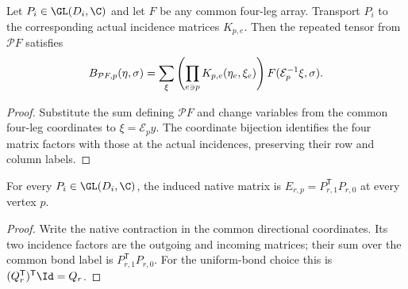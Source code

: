 \begin{lemma}%
    \label{thm:peps_four_leg_incident_expansion}
    \leanok
    Let $P_i\in\GL(D_i,\C)$ and let $F$ be any common four-leg array.
    Transport $P_i$ to the corresponding actual incidence matrices $K_{p,e}$.
    Then the repeated tensor from $\mathcal P F$ satisfies
    \begin{align}
        B_{\mathcal P F,p}(\eta,\sigma)
        =\sum_\xi\left(\prod_{e\ni p}K_{p,e}(\eta_e,\xi_e)\right)
        F(\mathcal E_p^{-1}\xi,\sigma).\notag
    \end{align}
\end{lemma}
\begin{proof}\leanok
    Substitute the sum defining $\mathcal P F$ and change variables from
    the common four-leg coordinates to $\xi=\mathcal E_p y$.
    The coordinate bijection identifies the four matrix factors with
    those at the actual incidences, preserving their row and column labels.
\end{proof}

\begin{lemma}%
    \label{thm:peps_four_leg_native_edge_matrix}
    \leanok
    For every $P_i\in\GL(D_i,\C)$, the induced native matrix is
    $E_{r,p}=P_{r,1}^{\mathsf T}P_{r,0}$ at every vertex $p$.
\end{lemma}
\begin{proof}\leanok
    Write the native contraction in the common directional coordinates.
    Its two incidence factors are the outgoing and incoming matrices;
    their sum over the common bond label is
    $P_{r,1}^{\mathsf T}P_{r,0}$.
    For the uniform-bond choice this is
    $(Q_r^{\mathsf T})^{\mathsf T}\Id=Q_r$.
\end{proof}

